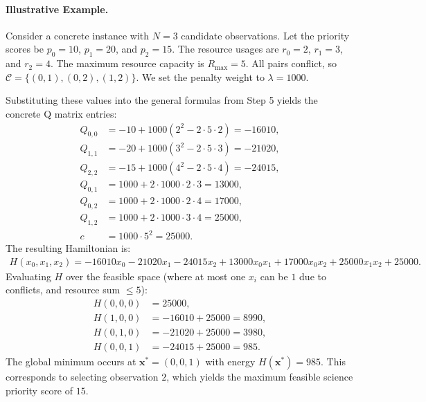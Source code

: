 \documentclass[12pt]{article}
\begin{document}
\paragraph{Illustrative Example.}
Consider a concrete instance with $N=3$ candidate observations. Let the priority scores be $p_0 = 10$, $p_1 = 20$, and $p_2 = 15$. The resource usages are $r_0 = 2$, $r_1 = 3$, and $r_2 = 4$. The maximum resource capacity is $R_{\max} = 5$. All pairs conflict, so $\mathcal{C} = \{(0,1), (0,2), (1,2)\}$. We set the penalty weight to $\lambda = 1000$.

Substituting these values into the general formulas from Step 5 yields the concrete Q matrix entries:
\begin{align}
    Q_{0,0} &= -10 + 1000(2^2 - 2 \cdot 5 \cdot 2) = -16010, \\
    Q_{1,1} &= -20 + 1000(3^2 - 2 \cdot 5 \cdot 3) = -21020, \\
    Q_{2,2} &= -15 + 1000(4^2 - 2 \cdot 5 \cdot 4) = -24015, \\
    Q_{0,1} &= 1000 + 2 \cdot 1000 \cdot 2 \cdot 3 = 13000, \\
    Q_{0,2} &= 1000 + 2 \cdot 1000 \cdot 2 \cdot 4 = 17000, \\
    Q_{1,2} &= 1000 + 2 \cdot 1000 \cdot 3 \cdot 4 = 25000, \\
    c &= 1000 \cdot 5^2 = 25000.
\end{align}
The resulting Hamiltonian is:
\begin{align}
    H(x_0, x_1, x_2) = -16010 x_0 - 21020 x_1 - 24015 x_2 + 13000 x_0 x_1 + 17000 x_0 x_2 + 25000 x_1 x_2 + 25000.
\end{align}
Evaluating $H$ over the feasible space (where at most one $x_i$ can be $1$ due to conflicts, and resource sum $\leq 5$):
\begin{align}
    H(0,0,0) &= 25000, \\
    H(1,0,0) &= -16010 + 25000 = 8990, \\
    H(0,1,0) &= -21020 + 25000 = 3980, \\
    H(0,0,1) &= -24015 + 25000 = 985.
\end{align}
The global minimum occurs at $\mathbf{x}^* = (0,0,1)$ with energy $H(\mathbf{x}^*) = 985$. This corresponds to selecting observation $2$, which yields the maximum feasible science priority score of $15$.
\end{document}
